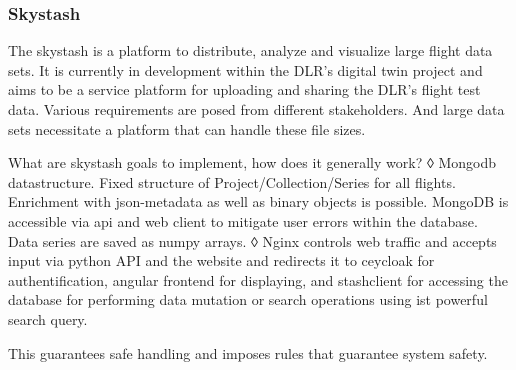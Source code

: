 
\subsubsection{Skystash}
\label{chap:skystash}
The skystash is a platform to distribute, analyze and visualize large flight data sets. It is currently in development within the DLR's digital twin project and aims to be a service platform for uploading and sharing the DLR's flight test data. Various requirements are posed from different stakeholders. And large data sets necessitate a platform that can handle these file sizes.




What are skystash goals to implement, how does it generally work? ◊ Mongodb datastructure. Fixed structure of Project/Collection/Series for all flights. Enrichment with json-metadata as well as binary objects is possible. MongoDB is accessible via api and web client to mitigate user errors within the database. Data series are saved as numpy arrays. ◊ Nginx controls web traffic and accepts input via python API and the website and redirects it to ceycloak for authentification, angular frontend for displaying, and stashclient for accessing the database for performing data mutation or search operations using ist powerful search query.

This guarantees safe handling and imposes rules that guarantee system safety.

